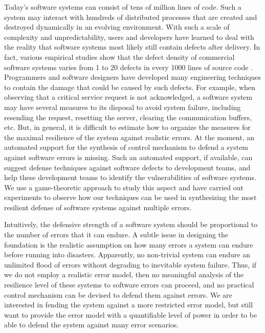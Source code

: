 \documentclass[times,10pt,twocolumn]{article}
\begin{document}
Today's software systems can consist of tens of million lines of code. 
Such a system may interact with hundreds of distributed processes 
that are created and destroyed dynamically in an evolving environment.  
With such a scale of complexity and unpredictability, 
users and developers have learned to deal with the reality that 
software systems most likely still contain defects after delivery.  
In fact, various empirical studies show that the defect density of commercial software systems 
varies from 1 to 20 defects in every 1000 lines of source code 
\cite{Sommerville07}. 
Programmers \label{reply1.control.eval.intro}
and software designers have developed many engineering 
techniques to contain the damage that could be caused by such defects.  
For example, when observing that a critical service request is not 
acknowledged, a software system may have several measures to its disposal to
avoid system failure, including 
resending the request, 
resetting the server, 
clearing the communication buffers, etc. 
But, in general, it is difficult to estimate how to organize the measures 
for the maximal resilience of the system against realistic errors.  
At the moment, an automated support for the synthesis of 
control mechanism to defend a system against software errors is missing.  
Such an automated support, if available, can suggest defense techniques against software defects to development teams,
and help these development teams to identify the vulnerabilities of software systems.    
We use a game-theoretic approach to study this aspect and have
carried out experiments to 
observe how our techniques can be used in synthesizing the most resilient 
defense of software systems against multiple errors.  

Intuitively, the defensive strength of a software system should be proportional 
to the number of errors that it can endure.  
A subtle issue in designing the foundation 
is the realistic assumption on how many errors a system can endure before running into disasters.  
Apparently, 
\label{reply1.realistic.system.failure}
no non-trivial system can endure an unlimited flood of errors without 
degrading to inevitable system failure. 
Thus, if we do not employ a realistic error model, then 
no meaningful analysis of the resilience level of these systems to software errors can proceed, 
and no practical control mechanism can be devised to defend them against errors.   
We are interested in fending the system against a more restricted error model, but still want to provide the error model with a quantifiable level of power in order to be able to defend the system against many error scenarios.
\end{document}

